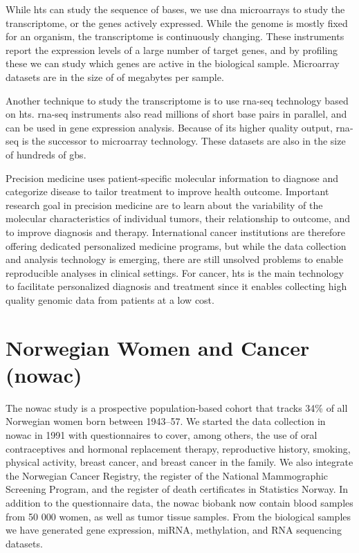 While \gls{hts} can study the sequence of bases, we use \gls{dna} microarrays to
study the transcriptome, or the genes actively expressed. While the genome is
mostly fixed for an organism, the transcriptome is continuously changing. These
instruments report the expression levels of a large number of target genes, and
by profiling these we can study which genes are active in the biological sample.
Microarray datasets are in the size of of megabytes per sample. 

Another technique to study the transcriptome is to use \gls{rna}-seq technology
based on \gls{hts}. \gls{rna}-seq instruments also read millions of short base
pairs in parallel, and can be used in gene expression analysis. Because of its
higher quality output, \gls{rna}-seq is the successor to microarray technology.
These datasets are also in the size of hundreds of \glspl{gb}.

Precision medicine uses patient-specific molecular information to diagnose and
categorize disease to tailor treatment to improve health
outcome.\cite{national2011toward} Important research goal in precision medicine
are to learn about the variability of the molecular characteristics of
individual tumors, their relationship to outcome, and to improve diagnosis and
therapy.\cite{tannock2016limits} International cancer institutions are therefore
offering dedicated personalized medicine programs, but while the data collection
and analysis technology is emerging, there are still unsolved problems to enable
reproducible analyses in clinical settings. For cancer, \gls{hts}
is the main technology to facilitate personalized diagnosis and
treatment since it enables collecting high quality genomic data from patients
at a low cost. 

\section{Norwegian Women and Cancer (\gls{nowac})} 
The \gls{nowac} study is a prospective population-based cohort that tracks 34\%
of all Norwegian women born between 1943–57.\cite{lund2007cohort} We started the
data collection in \gls{nowac} in 1991 with questionnaires to cover, among
others, the use of oral contraceptives and hormonal replacement therapy,
reproductive history, smoking, physical activity, breast cancer, and breast
cancer in the family.  We also integrate the Norwegian Cancer Registry, the
register of the National Mammographic Screening Program, and the register of
death certificates in Statistics Norway.  In addition to the questionnaire data,
the \gls{nowac} biobank now contain blood samples from 50 000 women, as well as
tumor tissue samples. From the biological samples we have generated gene
expression, miRNA, methylation, and RNA sequencing datasets. 

